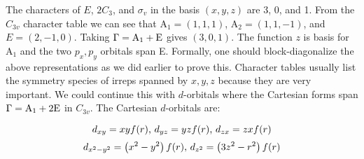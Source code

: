{The characters of $E$, $2C_3$, and $\sigma_v$ in the basis $(x,y,z)$ are 3, 0, and 1. From the $C_{3v}$ character table we can see that A$_1 = (1,1,1)$, A$_2 = (1, 1, -1)$, and $E = (2, -1, 0)$. Taking $\Gamma = \textnormal{A}_1 + \textnormal{E}$ gives $(3, 0, 1)$. The function $z$ is basis for A$_1$ and the two $p_x,p_y$ orbitals span E. Formally, one should block-diagonalize the above representations as we did earlier to prove this. Character tables usually list the symmetry species of irreps spanned by $x,y,z$ because they are very important. We could continue this with $d$-orbitals where the Cartesian forms span $\Gamma = \textnormal{A}_1 + 2\textnormal{E}$ in $C_{3v}$. The Cartesian $d$-orbitals are:

\vspace*{-0.3cm}

$$d_{xy} = xyf(r)\textnormal{, }d_{yz} = yzf(r)\textnormal{, }d_{zx} = zxf(r)$$
$$d_{x^2-y^2} = \left(x^2 - y^2\right)f(r)\textnormal{, }d_{z^2} = \left(3z^2 - r^2\right)f(r)$$

}

